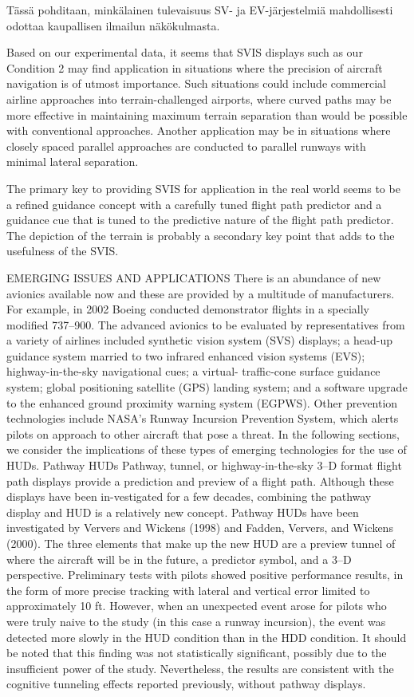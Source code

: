 \documentclass[utf8,bachelor,manualbib]{gradu3}
\begin{document}
Tässä pohditaan, minkälainen tulevaisuus SV- ja EV-järjestelmiä mahdollisesti odottaa kaupallisen ilmailun näkökulmasta.

Based on our experimental data, it seems that SVIS displays such as our Condition
2 may find application in situations where the precision of aircraft navigation is of
utmost importance. Such situations could include commercial airline approaches
into terrain-challenged airports, where curved paths may be more effective in
maintaining maximum terrain separation than would be possible with conventional
approaches. Another application may be in situations where closely spaced
parallel approaches are conducted to parallel runways with minimal lateral separation. \citep{schnell2004}

The primary key to
providing SVIS for application in the real world seems to be a refined guidance
concept with a carefully tuned flight path predictor and a guidance cue that is tuned
to the predictive nature of the flight path predictor. The depiction of the terrain is
probably a secondary key point that adds to the usefulness of the SVIS. \citep{schnell2004}

EMERGING ISSUES AND APPLICATIONS
There is an abundance of new avionics available now and these are provided by
a multitude of manufacturers. For example, in 2002 Boeing conducted demonstrator
flights in a specially modified 737–900. The advanced avionics to be
evaluated by representatives from a variety of airlines included synthetic vision
system (SVS) displays; a head-up guidance system married to two infrared enhanced
vision systems (EVS); highway-in-the-sky navigational cues; a virtual-
traffic-cone surface guidance system; global positioning satellite (GPS)
landing system; and a software upgrade to the enhanced ground proximity warning
system (EGPWS). Other prevention technologies include NASA’s Runway
Incursion Prevention System, which alerts pilots on approach to other aircraft
that pose a threat. In the following sections, we consider the implications of
these types of emerging technologies for the use of HUDs.
Pathway HUDs
Pathway, tunnel, or highway-in-the-sky 3–D format flight path displays provide
a prediction and preview of a flight path. Although these displays have been in-vestigated for a few decades, combining the pathway display and HUD is a relatively
new concept.
Pathway HUDs have been investigated by Ververs and Wickens (1998) and
Fadden, Ververs, and Wickens (2000). The three elements that make up the new
HUD are a preview tunnel of where the aircraft will be in the future, a predictor
symbol, and a 3–D perspective. Preliminary tests with pilots showed positive performance
results, in the form of more precise tracking with lateral and vertical error
limited to approximately 10 ft. However, when an unexpected event arose for
pilots who were truly naive to the study (in this case a runway incursion), the event
was detected more slowly in the HUD condition than in the HDD condition. It
should be noted that this finding was not statistically significant, possibly due to
the insufficient power of the study. Nevertheless, the results are consistent with the
cognitive tunneling effects reported previously, without pathway displays. \citep{crawford2006}
\end{document}
